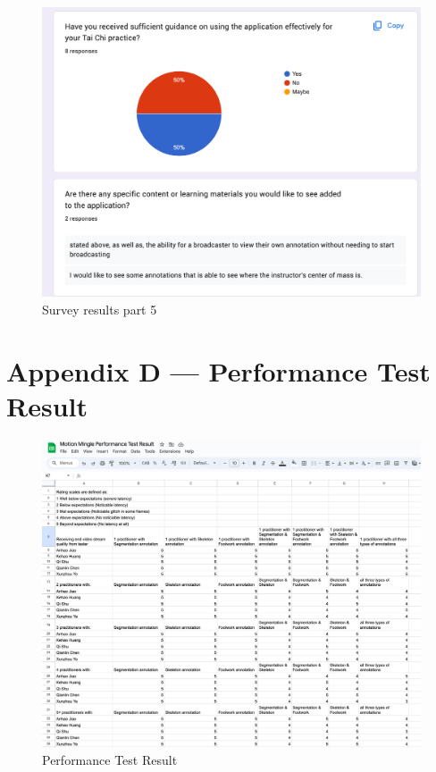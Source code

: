 \documentclass[12pt, titlepage]{article}
\begin{document}
\begin{figure}[!]
  \centering
  \includegraphics[width=1.0\linewidth]{surveyp5.png}
  \caption{Survey results part 5}
  \label{fig:surveyp5}
\end{figure}
\FloatBarrier

\section*{Appendix D --- Performance Test Result}
\begin{figure}[h!]
  \centering
  \includegraphics[width=1.0\linewidth]{performance.png}
  \caption{Performance Test Result}
  \label{fig:performance}
\end{figure}
\end{document}
